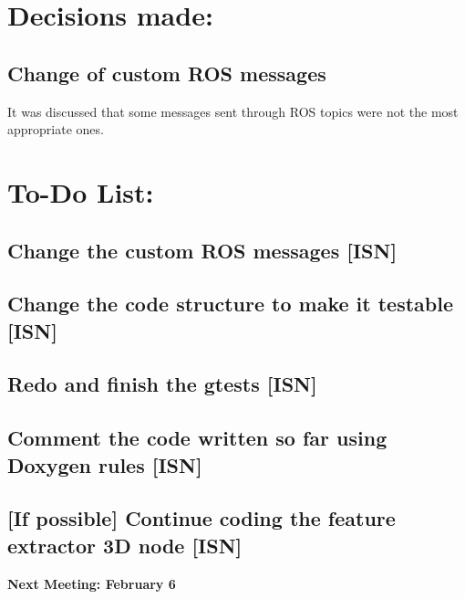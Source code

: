 \documentclass{article}
\newenvironment{myindentpar}[1]%
 {\begin{list}{}%
         {\setlength{\leftmargin}{#1}}%
         \item[]%
 }
 {\end{list}}
\begin{document}
\section{\LARGE Decisions made:}
	\subsection{Change of custom ROS messages}
		\begin{myindentpar}{1cm} 
It was discussed that some messages sent through ROS topics were not the most appropriate ones. 
		\end{myindentpar}


\section{\LARGE To-Do List: }
	\subsection{Change the custom ROS messages [ISN]}
		\begin{myindentpar}{1cm} 

		\end{myindentpar}
  \subsection{Change the code structure to make it testable [ISN]}
  \subsection{Redo and finish the gtests [ISN]}
  \subsection {Comment the code written so far using Doxygen rules [ISN]}
  \subsection { [If possible] Continue coding the feature extractor 3D node [ISN]}
\begin {center}
{\Large \textbf{Next Meeting: February 6 }}
\end{center}
\end{document}
